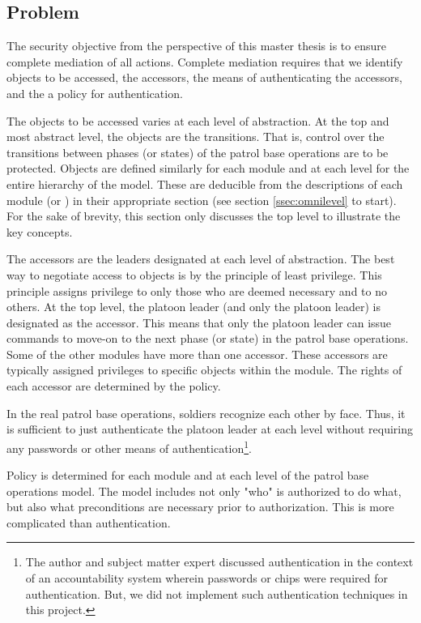\documentclass[../../main/main.tex]{subfiles}
\begin{document}
\subsection{Problem}
The security objective from the perspective of this master thesis is to ensure complete mediation of all actions.  Complete mediation requires that we identify objects to be accessed, the accessors, the means of authenticating the accessors, and the a policy for authentication.  

The objects to be accessed varies at each level of abstraction. At the top and most abstract level, the objects are the transitions.  That is, control over the transitions between phases (or states) of the patrol base operations are to be protected.  Objects are defined similarly for each module and at each level for the entire hierarchy of the model.  These are deducible from the descriptions of each module (or ) in their appropriate section (see section \ref{ssec:omnilevel} to start).  For the sake of brevity, this section only discusses the top level to illustrate the key concepts.  

The accessors are the leaders designated at each level of abstraction.  The best way to negotiate access to objects is by the principle of least privilege.  This principle assigns privilege to only those who are deemed necessary and to no others.  At the top level, the platoon leader (and only the platoon leader) is designated as the accessor. This means that only the platoon leader can issue commands to move-on to the next phase (or state) in the patrol base operations. Some of the other modules have more than one accessor.  These accessors are typically assigned privileges to specific objects within the module.  The rights of each accessor are determined by the policy.

In the real patrol base operations, soldiers recognize each other by face.  Thus, it is sufficient to just authenticate the platoon leader at each level without requiring any passwords or other means of authentication\footnote{The author and subject matter expert discussed authentication in the context of an accountability system wherein passwords or chips were required for authentication.  But, we did not implement such authentication techniques in this project.}.

Policy is determined for each module and at each level of the patrol base operations model.  The model includes not only "who" is authorized to do what, but also what preconditions are necessary prior to authorization.  This is more complicated than authentication.
\end{document}
